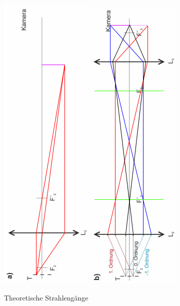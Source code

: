 \documentclass[12pt,a4paper,twoside]{article}
\begin{document}
\begin{figure}[H]
    \centering
    \includegraphics[width=0.3\linewidth, angle=-90]{nudes/Strahlenganga.png}
    \includegraphics[width=0.3\linewidth, angle=-90]{nudes/Strahlengangb.png}
    \caption{Theoretische Strahlengänge}
    \label{fig:theorStrahlengang}
\end{figure}
\end{document}

